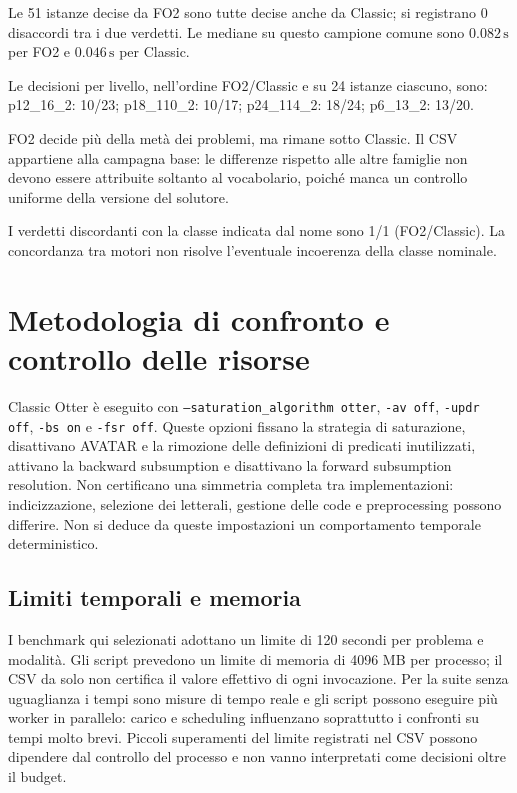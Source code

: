 Le 51 istanze decise da FO2 sono tutte decise anche da Classic; si registrano 0 disaccordi tra i due verdetti. Le mediane su questo campione comune sono $0.082\,\mathrm{s}$ per FO2 e $0.046\,\mathrm{s}$ per Classic.

Le decisioni per livello, nell’ordine FO2/Classic e su 24 istanze ciascuno, sono: p12\_16\_2: 10/23; p18\_110\_2: 10/17; p24\_114\_2: 18/24; p6\_13\_2: 13/20.

FO2 decide più della metà dei problemi, ma rimane sotto Classic. Il CSV appartiene alla campagna base: le differenze rispetto alle altre famiglie non devono essere attribuite soltanto al vocabolario, poiché manca un controllo uniforme della versione del solutore.

I verdetti discordanti con la classe indicata dal nome sono 1/1 (FO2/Classic). La concordanza tra motori non risolve l’eventuale incoerenza della classe nominale.

\section{Metodologia di confronto e controllo delle risorse}
\label{sec:metodologia_fair_comparison}
Classic Otter è eseguito con \texttt{--saturation\_algorithm otter}, \texttt{-av off}, \texttt{-updr off}, \texttt{-bs on} e \texttt{-fsr off}. Queste opzioni fissano la strategia di saturazione, disattivano AVATAR e la rimozione delle definizioni di predicati inutilizzati, attivano la backward subsumption e disattivano la forward subsumption resolution. Non certificano una simmetria completa tra implementazioni: indicizzazione, selezione dei letterali, gestione delle code e preprocessing possono differire. Non si deduce da queste impostazioni un comportamento temporale deterministico.

\subsection{Limiti temporali e memoria}
I benchmark qui selezionati adottano un limite di 120 secondi per problema e modalità. Gli script prevedono un limite di memoria di 4096 MB per processo; il CSV da solo non certifica il valore effettivo di ogni invocazione. Per la suite senza uguaglianza i tempi sono misure di tempo reale e gli script possono eseguire più worker in parallelo: carico e scheduling influenzano soprattutto i confronti su tempi molto brevi. Piccoli superamenti del limite registrati nel CSV possono dipendere dal controllo del processo e non vanno interpretati come decisioni oltre il budget.

